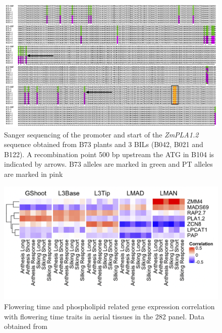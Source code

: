 \documentclass[9pt,twocolumn,twoside,lineno]{BioRxiv}
\begin{document}
\begin{figure}[t]
\begin{center}
\includegraphics[width=0.8\paperwidth]{Sup_Figures/Sup_Fig_6.png}
\caption{Sanger sequencing of the promoter and start of the \textit{ZmPLA1.2} sequence obtained from B73 plants and 3 BILs (B042, B021 and B122). A recombination point 500 bp upstream the ATG in B104 is indicated by arrows. B73 alleles are marked in green and PT alleles are marked in pink}
\label{SupFig5}
\end{center}
\end{figure} 

\begin{figure}[t]
\begin{center}
\includegraphics[width=0.8\paperwidth]{Sup_Figures/Sup_Fig_7.png}
\caption{Flowering time and phospholipid related gene expression correlation with flowering time traits in aerial tissues in the 282 panel. 
Data obtained from \cite{Kremling2018-gn}
}
\label{SupFig7}
\end{center}
\end{figure} 
\end{document}
